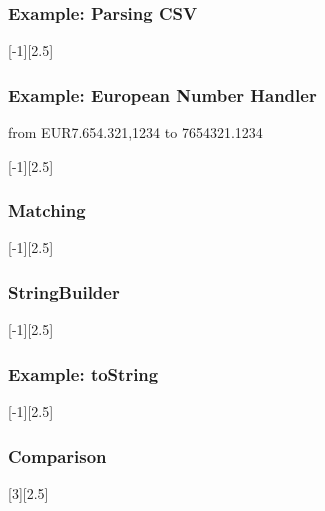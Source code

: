 \documentclass{beamer}
\begin{document}
\begin{frame}\frametitle{Example: Parsing CSV}
	[-1][2.5]
\end{frame}



\begin{frame}\frametitle{Example: European Number Handler}
	from EUR7.654.321,1234 to 7654321.1234
	
	[-1][2.5]
\end{frame}






\begin{frame}\frametitle{Matching}
	[-1][2.5]
\end{frame}






\begin{frame}\frametitle{StringBuilder}
	[-1][2.5]
\end{frame}



\begin{frame}\frametitle{Example: toString}
	[-1][2.5]
\end{frame}







\begin{frame}\frametitle{Comparison}
	[2.5]
\end{frame}
\end{document}
